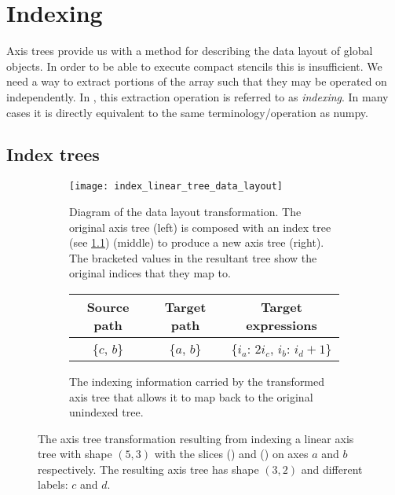 \documentclass[thesis]{subfiles}
\begin{document}

\chapter{Indexing}

Axis trees provide us with a method for describing the data layout of global objects.
In order to be able to execute compact stencils this is insufficient.
We need a way to extract portions of the array such that they may be operated on independently.
In , this extraction operation is referred to as \textit{indexing}.
In many cases it is directly equivalent to the same terminology/operation as numpy.

\section{Index trees}
\label{sec:index_trees}

\begin{figure}[h]
  \centering
  \begin{subfigure}{\textwidth}
    \centering
    \texttt{[image: index\_linear\_tree\_data\_layout]}
    \caption{
      Diagram of the data layout transformation.
      The original axis tree (left) is composed with an index tree (see \cref{sec:index_trees}) (middle) to produce a new axis tree (right).
      The bracketed values in the resultant tree show the original indices that they map to.
    }
    \label{fig:index_linear_tree_data_layout}
  \end{subfigure}

  \vspace{1em}

  \begin{subfigure}{\textwidth}
    \centering
    \begin{tabular}{|c|c|c|}
      \hline
      \textbf{Source path} & \textbf{Target path} & \textbf{Target expressions} \\
      \hline
      \{$c$, $b$\} & \{$a$, $b$\} & \{$i_a$: $2 i_c$, $i_b$: $i_d+1$\} \\
      \hline
    \end{tabular}
    \caption{
      The indexing information carried by the transformed axis tree that allows it to map back to the original unindexed tree.
    }
    \label{fig:index_linear_tree_exprs}
  \end{subfigure}

  \caption{
    The axis tree transformation resulting from indexing a linear axis tree with shape $(5, 3)$ with the slices () and () on axes $a$ and $b$ respectively.
    The resulting axis tree has shape $(3, 2)$ and different labels: $c$ and $d$.
  }
  \label{fig:index_linear_tree_all}
\end{figure}
\end{document}
